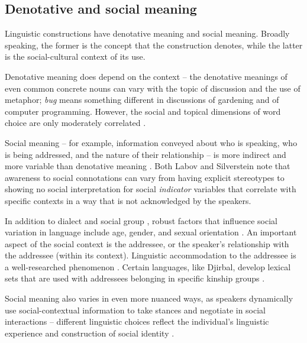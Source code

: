 \documentclass{frontiersSCNS} %
\begin{document}
\subsection{Denotative and social meaning}

Linguistic constructions have denotative meaning and social meaning. Broadly speaking, the former is the concept that the construction denotes, while the latter is the social-cultural context of its use. 

Denotative meaning does depend on the context -- the denotative meanings of even common concrete nouns can vary with the topic of discussion and the use of metaphor; {\it bug} means something different in discussions of gardening and of computer programming. However, the social and topical dimensions of word choice are only moderately correlated \citep{altmann2011niche}.

Social meaning -- for example, information conveyed about who is speaking, who is being addressed, and the nature of their relationship -- is more indirect and more variable than denotative meaning \citep{foulkes2006social, preston1996whaddayaknow,labov2001,silverstein2001}. Both Labov and Silverstein note that awareness to social connotations can vary from having explicit stereotypes to showing no social interpretation for social \emph{indicator} variables that correlate with specific contexts in a way that is not acknowledged by the speakers.

In addition to dialect \citep{wells1982} and social group \citep{eckert2000}, robust factors that influence social variation in language include age, gender, and sexual orientation \citep{tagliamonte2009, labov2001, pierrehumbert2004}. An important aspect of the social context is the addressee, or the speaker's relationship with the addressee (within its context). Linguistic accommodation to the addressee is a well-researched phenomenon \citep{soliz2014relational,coupland1991accommodation}. Certain languages, like Djirbal, develop lexical sets that are used with addressees belonging in specific kinship groups \citep{dixon1980}.

Social meaning also varies in even more nuanced ways, as speakers dynamically use social-contextual information to take stances and negotiate in social interactions -- different linguistic choices reflect the individual's linguistic experience and construction of social identity \citep{milroy1980, eckert2000}. 
\end{document}
